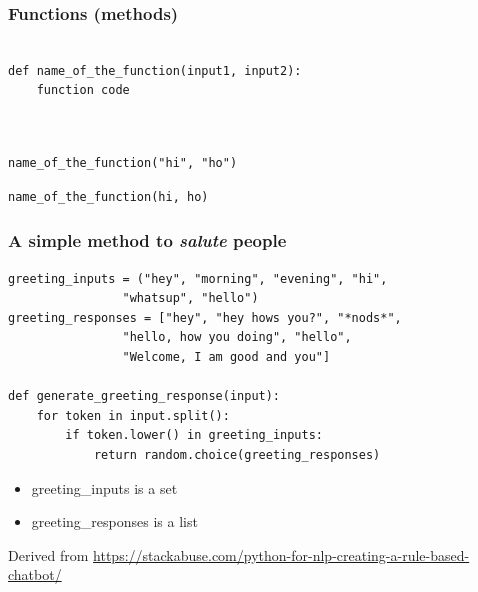 \documentclass{beamer}
\begin{document}
\begin{frame}[fragile]
\frametitle{Functions (methods)}
\vspace{5mm}

\begin{block}{}
\begin{verbatim}

def name_of_the_function(input1, input2):
    function code
    
   
\end{verbatim}
\end{block}
\pause 

\begin{block}{}
\begin{verbatim}
name_of_the_function("hi", "ho")
\end{verbatim}
\end{block}
\pause 

\begin{block}{}
\begin{verbatim}
name_of_the_function(hi, ho)

\end{verbatim}
\end{block}

\end{frame}


\begin{frame}[fragile]
\frametitle{A simple method to \textit{salute} people}
\vspace{5mm}

\begin{block}{}
\begin{verbatim}
greeting_inputs = ("hey", "morning", "evening", "hi",
                "whatsup", "hello")
greeting_responses = ["hey", "hey hows you?", "*nods*",
                "hello, how you doing", "hello",
                "Welcome, I am good and you"]

def generate_greeting_response(input):
    for token in input.split():
        if token.lower() in greeting_inputs:
            return random.choice(greeting_responses)
\end{verbatim}
\end{block}
\pause

\begin{itemize}
 \item greeting\_inputs is a \alert{set}
 \item greeting\_responses is a \alert{list}
\end{itemize}

\onslide
\footnotesize
Derived from
\url{https://stackabuse.com/python-for-nlp-creating-a-rule-based-chatbot/}
\end{frame}
\end{document}
